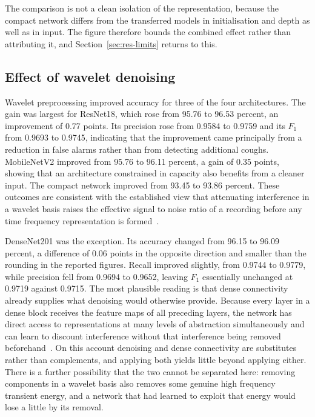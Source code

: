 The comparison is not a clean isolation of the representation, because the
compact network differs from the transferred models in initialisation and
depth as well as in input. The figure therefore bounds the combined effect
rather than attributing it, and Section~\ref{sec:res-limits} returns to this.

\subsection{Effect of wavelet denoising}\label{sec:res-denoise}

Wavelet preprocessing improved accuracy for three of the four architectures.
The gain was largest for ResNet18, which rose from 95.76 to 96.53 percent, an
improvement of 0.77 points. Its precision rose from 0.9584 to 0.9759 and its
$F_1$ from 0.9693 to 0.9745, indicating that the improvement came principally
from a reduction in false alarms rather than from detecting additional coughs.
MobileNetV2 improved from 95.76 to 96.11 percent, a gain of 0.35 points,
showing that an architecture constrained in capacity also benefits from a
cleaner input. The compact network improved from 93.45 to 93.86 percent.
These outcomes are consistent with the established view that attenuating
interference in a wavelet basis raises the effective signal to noise ratio of
a recording before any time frequency representation is
formed~\cite{mallat1989, donoho1995}.

DenseNet201 was the exception. Its accuracy changed from 96.15 to 96.09
percent, a difference of 0.06 points in the opposite direction and smaller
than the rounding in the reported figures. Recall improved slightly, from
0.9744 to 0.9779, while precision fell from 0.9694 to 0.9652, leaving $F_1$
essentially unchanged at 0.9719 against 0.9715. The most plausible reading is
that dense connectivity already supplies what denoising would otherwise
provide. Because every layer in a dense block receives the feature maps of all
preceding layers, the network has direct access to representations at many
levels of abstraction simultaneously and can learn to discount interference
without that interference being removed beforehand~\cite{huang2017}. On this
account denoising and dense connectivity are substitutes rather than
complements, and applying both yields little beyond applying either. There is
a further possibility that the two cannot be separated here: removing
components in a wavelet basis also removes some genuine high frequency
transient energy, and a network that had learned to exploit that energy would
lose a little by its removal.

